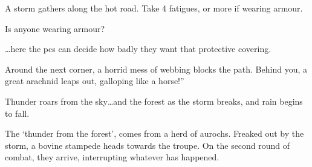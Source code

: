 \begin{multicols}{2}
\begin{exampletext}
  \begin{speechtext}
    A storm gathers along the hot road.
    Take 4 \glspl{fatigue}, or more if wearing armour.

    Is anyone wearing armour?
  \end{speechtext}

  \ldots here the \glspl{pc} can decide how badly they want that protective covering.

  \begin{speechtext}
    Around the next corner, a horrid mess of webbing blocks the path.
    Behind you, a great arachnid leaps out, galloping like a horse!''

    Thunder roars from the sky\ldots and the forest as the storm breaks, and rain begins to fall.
  \end{speechtext}

  The `thunder from the forest', comes from a herd of aurochs.
  Freaked out by the storm, a bovine stampede heads towards the troupe.
  On the second round of combat, they arrive, interrupting whatever has happened.

\end{exampletext}

\end{multicols}

\bigLine

